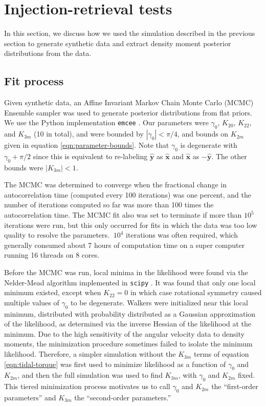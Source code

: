 \documentclass[fleqn,usenatbib]{mnras}
\newcommand{\unit}[1]{\bm{\hat{#1}}}
\begin{document}
\section{Injection-retrieval tests}
\label{sec:injection-retrieval}

In this section, we discuss how we used the simulation described in the previous section to generate synthetic data and extract density moment posterior distributions from the data.

\subsection{Fit process}
\label{sec:fit}
Given synthetic data, an Affine Invariant Markov Chain Monte Carlo (MCMC) Ensemble sampler was used to generate posterior distributions from flat priors. We use the Python implementation \texttt{emcee} \cite{foreman2013emcee}. Our parameters were $\gamma_0$, $K_{20}$, $K_{22}$, and $K_{3m}$ (10 in total), and were bounded by $|\gamma_0| < \pi/4$, and bounds on $K_{2 m}$ given in equation \ref{eqn:parameter-bounds}. Note that $\gamma_0$ is degenerate with $\gamma_0 + \pi/2$ since this is equivalent to re-labeling $\unit y$ as $\unit x$ and $\unit x$ as $-\unit y$. The other bounds were $|K_{3m}| < 1$.

The MCMC was determined to converge when the fractional change in autocorrelation time (computed every 100 iterations) was one percent, and the number of iterations computed so far was more than 100 times the autocorrelation time. The MCMC fit also was set to terminate if more than $10^5$ iterations were run, but this only occurred for fits in which the data was too low quality to resolve the parameters. $~10^4$ iterations was often required, which generally consumed about 7 hours of computation time on a super computer running 16 threads on 8 cores.

Before the MCMC was run, local minima in the likelihood were found via the Nelder-Mead algorithm implemented in \texttt{scipy} \cite{Gao2012}. It was found that only one local minimum existed, except when $K_{22}=0$ in which case rotational symmetry caused multiple values of $\gamma_0$ to be degenerate. Walkers were initialized near this local minimum, distributed with probability distributed as a Gaussian approximation of the likelihood, as determined via the inverse Hessian of the likelihood at the minimum. Due to the high sensitivity of the angular velocity data to density moments, the minimization procedure sometimes failed to isolate the minimum likelihood. Therefore, a simpler simulation without the $K_{3m}$ terms of equation \ref{eqn:tidal-torque} was first used to minimize likelihood as a function of $\gamma_0$ and $K_{2m}$, and then the full simulation was used to find $K_{3m}$, with $\gamma_0$ and $K_{2m}$ fixed. This tiered minimization process motivates us to call $\gamma_0$ and $K_{2m}$ the ``first-order parameters'' and $K_{3m}$ the ``second-order parameters.''
\end{document}
